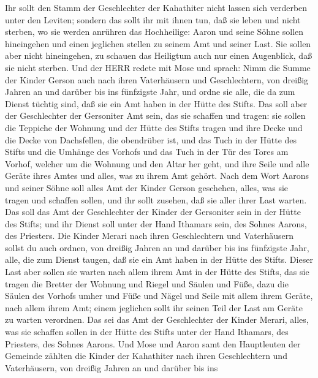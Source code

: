  Ihr sollt den Stamm der Geschlechter der Kahathiter nicht
lassen sich verderben unter den Leviten;  sondern das sollt
ihr mit ihnen tun, daß sie leben und nicht sterben, wo sie werden
anrühren das Hochheilige: Aaron und seine Söhne sollen hineingehen und
einen jeglichen stellen zu seinem Amt und seiner Last.  Sie
sollen aber nicht hineingehen, zu schauen das Heiligtum auch nur einen
Augenblick, daß sie nicht sterben.  Und der HERR redete mit
Mose und sprach:  Nimm die Summe der Kinder Gerson auch
nach ihren Vaterhäusern und Geschlechtern,  von dreißig
Jahren an und darüber bis ins fünfzigste Jahr, und ordne sie alle, die
da zum Dienst tüchtig sind, daß sie ein Amt haben in der Hütte des
Stifts.  Das soll aber der Geschlechter der Gersoniter Amt
sein, das sie schaffen und tragen:  sie sollen die Teppiche
der Wohnung und der Hütte des Stifts tragen und ihre Decke und die Decke
von Dachsfellen, die obendrüber ist, und das Tuch in der Hütte des
Stifts  und die Umhänge des Vorhofs und das Tuch in der Tür
des Tores am Vorhof, welcher um die Wohnung und den Altar her geht, und
ihre Seile und alle Geräte ihres Amtes und alles, was zu ihrem Amt
gehört.  Nach dem Wort Aarons und seiner Söhne soll alles
Amt der Kinder Gerson geschehen, alles, was sie tragen und schaffen
sollen, und ihr sollt zusehen, daß sie aller ihrer Last warten.
 Das soll das Amt der Geschlechter der Kinder der
Gersoniter sein in der Hütte des Stifts; und ihr Dienst soll unter der
Hand Ithamars sein, des Sohnes Aarons, des Priesters.  Die
Kinder Merari nach ihren Geschlechtern und Vaterhäusern sollst du auch
ordnen,  von dreißig Jahren an und darüber bis ins
fünfzigste Jahr, alle, die zum Dienst taugen, daß sie ein Amt haben in
der Hütte des Stifts.  Dieser Last aber sollen sie warten
nach allem ihrem Amt in der Hütte des Stifts, das sie tragen die Bretter
der Wohnung und Riegel und Säulen und Füße,  dazu die
Säulen des Vorhofs umher und Füße und Nägel und Seile mit allem ihrem
Geräte, nach allem ihrem Amt; einem jeglichen sollt ihr seinen Teil der
Last am Geräte zu warten verordnen.  Das sei das Amt der
Geschlechter der Kinder Merari, alles, was sie schaffen sollen in der
Hütte des Stifts unter der Hand Ithamars, des Priesters, des Sohnes
Aarons.  Und Mose und Aaron samt den Hauptleuten der
Gemeinde zählten die Kinder der Kahathiter nach ihren Geschlechtern und
Vaterhäusern,  von dreißig Jahren an und darüber bis ins
